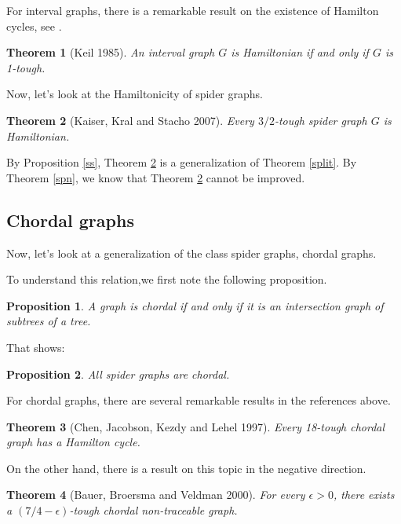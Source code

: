 \documentclass[12pt]{report}
\newtheorem{theorem}{Theorem}
\newtheorem{proposition}{Proposition}
\begin{document}
For interval graphs, there is a remarkable result on the existence of Hamilton cycles, see \cite{keil1985finding}.

\begin{theorem}[Keil 1985]\label{thmintg1th85}
An interval graph $G$ is Hamiltonian if and only if $G$ is 1-tough.
\end{theorem}

Now, let's look at the Hamiltonicity of spider graphs.
\begin{theorem}[Kaiser, Kral and Stacho 2007]\label{spider}
Every $3/2$-tough spider graph $G$ is Hamiltonian.
\end{theorem}
By Proposition \ref{ss}, Theorem \ref{spider} is a generalization of Theorem \ref{split}. By Theorem \ref{spn}, we know that Theorem \ref{spider} cannot be improved.














\subsection{Chordal graphs}\label{secchoginht}



Now, let's look at a generalization of the class spider graphs, chordal graphs.

To understand this relation,we first note the following proposition.
\begin{proposition}
A graph is chordal if and only if it is an intersection graph of subtrees of a tree.
\end{proposition}

That shows:
\begin{proposition}
All spider graphs are chordal.
\end{proposition}



For chordal graphs, there are several remarkable results in the references above.

\begin{theorem}[Chen, Jacobson, Kezdy and Lehel 1997]\label{chord18}
Every 18-tough chordal graph has a Hamilton cycle.
\end{theorem}



On the other hand, there is a result on this topic in the negative direction.
\begin{theorem}[Bauer, Broersma and Veldman 2000]\label{count74ep}
For every $\epsilon>0$, there exists a $(7/4-\epsilon)$-tough chordal non-traceable graph.
\end{theorem}
\end{document}

